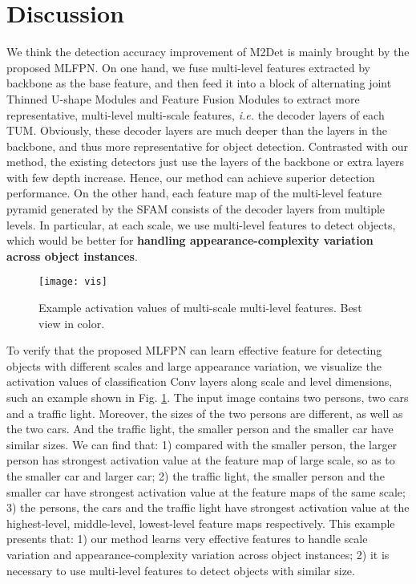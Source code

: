 \documentclass[letterpaper]{article} \usepackage{aaai18}  \usepackage{times}  \usepackage{helvet}  \usepackage{courier}  \usepackage{url}  \usepackage{graphicx}
\begin{document}
\section{Discussion}
We think the detection accuracy improvement of M2Det is mainly brought by the proposed MLFPN. On one hand, we fuse multi-level features extracted by backbone as the base feature, and then feed it into a block of alternating joint Thinned U-shape Modules and Feature Fusion Modules to extract more representative, multi-level multi-scale features, \textit{i.e.} the decoder layers of each TUM. Obviously, these decoder layers are much deeper than the layers in the backbone, and thus more representative for object detection. Contrasted with our method, the existing detectors \cite{abs-1711-06897,LinDGHHB17,FuLRTB17} just use the layers of the backbone or extra layers with few depth increase. Hence, our method can achieve superior detection performance. On the other hand, each feature map of the multi-level feature pyramid generated by the SFAM consists of the decoder layers from multiple levels. In particular, at each scale, we use multi-level features to detect objects, which would be better for \textbf{handling appearance-complexity variation across object instances}.

\begin{figure}[t]
\centering
\texttt{[image: vis]}
\caption{Example activation values of multi-scale multi-level features. Best view in color.}
\label{fig:vis}
\end{figure}
To verify that the proposed MLFPN can learn effective feature for detecting objects with different scales and large appearance variation, we visualize the activation values of classification Conv layers along scale and level dimensions, such an example shown in Fig. \ref{fig:vis}. The input image contains two persons, two cars and a traffic light. Moreover, the sizes of the two persons are different, as well as the two cars. And the traffic light, the smaller person and the smaller car have similar sizes. We can find that: 1) compared with the smaller person, the larger person has strongest activation value at the feature map of large scale, so as to the smaller car and larger car; 2) the traffic light, the smaller person and the smaller car have strongest activation value at the feature maps of the same scale; 3) the persons, the cars and the traffic light have strongest activation value at the highest-level, middle-level, lowest-level feature maps respectively. This example presents that: 1) our method learns very effective features to handle scale variation and appearance-complexity variation across object instances; 2) it is necessary to use multi-level features to detect objects with similar size.
\end{document}
